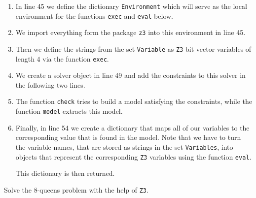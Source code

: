 \begin{enumerate}
\item In line 45 we define the dictionary \texttt{Environment}  which will serve as the local environment for
      the functions \texttt{exec} and \texttt{eval} below.
\item We import everything form the package \texttt{z3} into this environment in line 45.
\item Then we define the strings from the set \texttt{Variable} as \texttt{Z3} bit-vector variables of length $4$
      via the function \texttt{exec}.
\item We create a solver object in line 49 and add the constraints to this solver in the following two lines.
\item The function \texttt{check} tries to build a model satisfying the constraints, while the function
      \texttt{model} extracts this model.
\item Finally, in line 54 we create a dictionary that maps all of our variables to the corresponding value that
      is found in the model.  Note that we have to turn the variable names, that are stored as strings in the set
      \texttt{Variables}, into objects that represent the corresponding \texttt{Z3} variables using the
      function \texttt{eval}.

      This dictionary is then returned.
\end{enumerate}

\exercise
Solve the 8-queens problem with the help of \texttt{Z3}.


